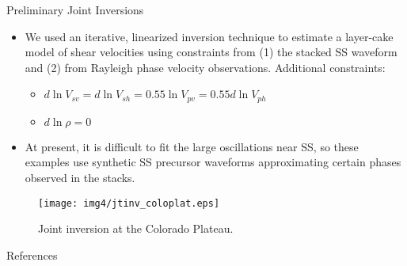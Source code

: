 \documentclass[final]{beamer}
\newlength{\onecolwid}
\begin{document}
\begin{frame}[t]
\begin{columns}[t]
\begin{column}{\onecolwid}

\begin{block}{Preliminary Joint Inversions}

\begin{itemize}

\item We used an iterative, linearized inversion technique to estimate a layer-cake model of shear velocities using constraints from (1) the stacked SS waveform and (2) from Rayleigh phase velocity observations.  Additional constraints:

	\begin{itemize}

	\item $d \ln V_{sv} = d \ln V_{sh} = 0.55 \ln V_{pv} = 0.55 d \ln V_{ph}$
	\item $d \ln \rho = 0$

	\end{itemize}

\item At present, it is difficult to fit the large oscillations near SS, so these examples use synthetic SS precursor waveforms approximating certain phases observed in the stacks.

\end{itemize}

\begin{figure}
\texttt{[image: img4/jtinv\_coloplat.eps]}
\caption{Joint inversion at the Colorado Plateau.}
\end{figure}

\end{block}


\begin{block}{References}


\tiny{
\vspace{0.75in}}

\end{block}



\end{column}
\end{columns}
\end{frame}
\end{document}
